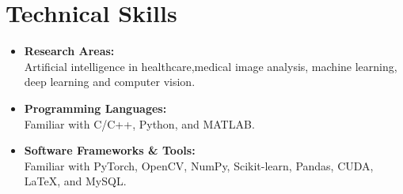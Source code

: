 \documentclass[a4,11pt]{article}
\newenvironment{zitemize}{
\begin{itemize}\itemsep0pt \parskip0pt \parsep1pt}
{\end{itemize}\vspace{-0.5cm}}
\begin{document}
\section{\large \textbf{Technical Skills}}
\begin{zitemize}
\item \textbf{Research Areas:} \\ 
			Artificial intelligence in healthcare,\space medical image analysis, \space machine learning, \space deep learning \space and \space computer vision.

\vspace{0.2cm}

\item \textbf{Programming Languages:} \\ 
			Familiar \space with \space C/C++, \space Python, \space and \space MATLAB.

\vspace{0.2cm}

\item \textbf{Software Frameworks \& Tools:}\\
			 Familiar \space with \space PyTorch, \space OpenCV, \space NumPy, \space Scikit-learn, \space Pandas,  \space CUDA, \space LaTeX, \space and \space MySQL.


\end{zitemize}



\end{document}
